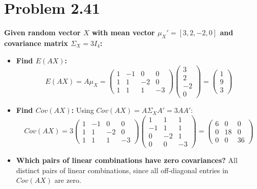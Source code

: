 \documentclass{article}
\begin{document}
\section*{Problem 2.41}
\noindent \textbf{Given random vector $X$ with mean vector $\mu_X' = [3, 2, -2, 0]$ and covariance matrix $\Sigma_X = 3I_4$:}
\begin{itemize}
    \item[(a)] \textbf{Find $E(AX)$:}
    \[
    E(AX) = A \mu_X = \begin{pmatrix}1&-1&0&0\\ 1&1&-2&0\\ 1&1&1&-3\end{pmatrix} \begin{pmatrix}3\\ 2\\ -2\\ 0\end{pmatrix} = \begin{pmatrix}1\\ 9\\ 3\end{pmatrix}
    \]

    \item[(b)] \textbf{Find $Cov(AX)$:}
    Using $Cov(AX) = A \Sigma_X A' = 3AA'$:
    \[
    Cov(AX) = 3 \begin{pmatrix}1&-1&0&0\\ 1&1&-2&0\\ 1&1&1&-3\end{pmatrix} \begin{pmatrix}1&1&1\\ -1&1&1\\ 0&-2&1\\ 0&0&-3\end{pmatrix} = \begin{pmatrix}6&0&0\\ 0&18&0\\ 0&0&36\end{pmatrix}
    \]

    \item[(c)] \textbf{Which pairs of linear combinations have zero covariances?}
    All distinct pairs of linear combinations, since all off-diagonal entries in $Cov(AX)$ are zero.
\end{itemize}
\end{document}
